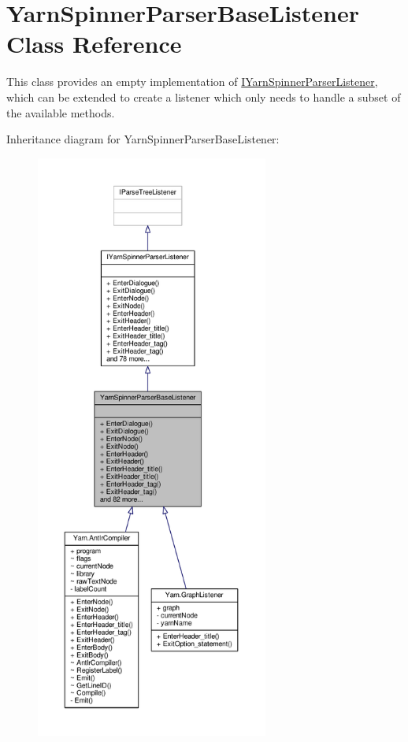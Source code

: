 \hypertarget{a00190}{\section{Yarn\-Spinner\-Parser\-Base\-Listener Class Reference}
\label{a00190}
}


This class provides an empty implementation of \hyperlink{a00118}{I\-Yarn\-Spinner\-Parser\-Listener}, which can be extended to create a listener which only needs to handle a subset of the available methods.  




Inheritance diagram for Yarn\-Spinner\-Parser\-Base\-Listener\-:
\nopagebreak
\begin{figure}[H]
\begin{center}
\leavevmode
\includegraphics[height=550pt]{a00399}
\end{center}
\end{figure}


